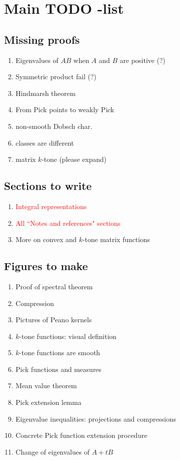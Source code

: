 \section{Main TODO -list}
\subsection{Missing proofs}
\begin{enumerate}
	\item Eigenvalues of $AB$ when $A$ and $B$ are positive (?)
	\item Symmetric product fail (?)
	\item Hindmarsh theorem
	\item From Pick points to weakly Pick
	\item non-smooth Dobsch char.
	\item classes are different
	\item matrix $k$-tone (please expand)
\end{enumerate}

\subsection{Sections to write}
\begin{enumerate}
	\item \textcolor{red}{Integral representations}
	\item \textcolor{red}{All ``Notes and references" sections}
	\item More on convex and $k$-tone matrix functions
\end{enumerate}

\subsection{Figures to make}
\begin{enumerate}
	\item Proof of spectral theorem
	\item Compression
	\item Pictures of Peano kernels
	\item $k$-tone functions: visual definition
	\item $k$-tone functions are smooth
	\item Pick functions and measures
	\item Mean value theorem
	\item Pick extension lemma
	\item Eigenvalue inequalities: projections and compressions
	\item Concrete Pick function extension procedure
	\item Change of eigenvalues of $A + t B$
\end{enumerate}


